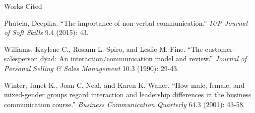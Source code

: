 \documentclass[12pt]{article}
\newcommand{\bibent}{\noindent \hangindent 40pt}
\newenvironment{workscited}{\newpage \begin{center} Works Cited \end{center}}{\newpage }
\begin{document}
\begin{flushleft}
\begin{workscited}
\bibent
Phutela, Deepika. ``The importance of non-verbal communication.'' \textit{IUP Journal of Soft Skills} 9.4 (2015): 43.

\bibent
Williams, Kaylene C., Rosann L. Spiro, and Leslie M. Fine. ``The customer-salesperson dyad: An interaction/communication model and review.'' \textit{Journal of Personal Selling \& Sales Management} 10.3 (1990): 29-43.

\bibent
Winter, Janet K., Joan C. Neal, and Karen K. Waner. ``How male, female, and mixed-gender groups regard interaction and leadership differences in the business communication course.''  \textit{Business Communication Quarterly} 64.3 (2001): 43-58.



\end{workscited}

\end{flushleft}
\end{document}

